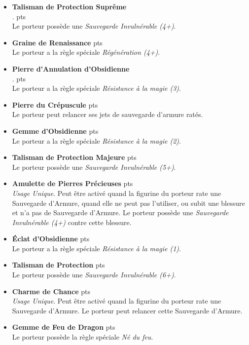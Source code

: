 \begin{multicols}{2}
\begin{itemize}[label={-}]
\item \textbf{Talisman de Protection Suprême} \\ . {pts} \\
Le porteur possède une \emph{Sauvegarde Invulnérable (4+)}.

\item \textbf{Graine de Renaissance}  {pts} \\
Le porteur a la règle spéciale \emph{Régénération (4+)}.

\item \textbf{Pierre d'Annulation d'Obsidienne} \\ . {pts} \\
Le porteur a la règle spéciale \emph{Résistance à la magie (3)}.

\item \textbf{Pierre du Crépuscule}  {pts} \\
Le porteur peut relancer ses jets de sauvegarde d'armure ratés.

\item \textbf{Gemme d'Obsidienne}  {pts} \\
Le porteur a la règle spéciale \emph{Résistance à la magie (2)}.

\item \textbf{Talisman de Protection Majeure}  {pts} \\
Le porteur possède une \emph{Sauvegarde Invulnérable (5+)}.

\bigskip\medskip
\item \textbf{Amulette de Pierres Précieuses}  {pts} \\
\emph{Usage Unique}. Peut être activé quand la figurine du porteur rate une Sauvegarde d'Armure, quand elle ne peut pas l'utiliser, ou subit une blessure et n'a pas de Sauvegarde d'Armure. Le porteur possède une \emph{Sauvegarde Invulnérable (4+)} contre cette blessure.

\item \textbf{Éclat d'Obsidienne}  {pts} \\
Le porteur a la règle spéciale \emph{Résistance à la magie (1)}.

\item \textbf{Talisman de Protection}  {pts} \\
Le porteur possède une \emph{Sauvegarde Invulnérable (6+)}.

\item \textbf{Charme de Chance}  {pts} \\
\emph{Usage Unique}. Peut être activé quand la figurine du porteur rate une Sauvegarde d'Armure. Le porteur peut relancer cette Sauvegarde d'Armure.

\item \textbf{Gemme de Feu de Dragon}  {pts} \\
Le porteur possède la règle spéciale \emph{Né du feu}.

\end{itemize}
\end{multicols}

